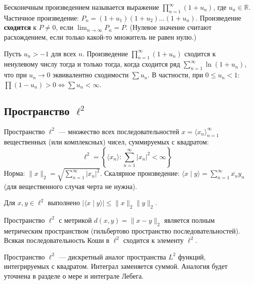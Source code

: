 \documentclass[11pt, a4paper]{extarticle}
\newcommand{\R}{{\mathbb R}}
\renewcommand{\le}{\leqslant}
\begin{document}
\begin{definition}
Бесконечным произведением называется выражение $\prod_{n=1}^\infty (1 + u_n)$, где $u_n \in \R$. Частичное произведение: $P_n = (1+u_1)(1+u_2)\ldots(1+u_n)$. Произведение \textbf{сходится} к $P \neq 0$, если $\lim_{n\to\infty} P_n = P$. (Нулевое значение считают расхождением, если только какой-то множитель не равен нулю.)
\end{definition}

\begin{theorem}
Пусть $u_n > -1$ для всех $n$. Произведение $\prod_{n=1}^\infty (1+u_n)$ сходится к ненулевому числу тогда и только тогда, когда сходится ряд $\sum_{n=1}^\infty \ln(1+u_n)$, что при $u_n \to 0$ эквивалентно сходимости $\sum u_n$. В частности, при $0 \le u_n < 1$: $\prod(1-u_n) > 0 \iff \sum u_n < \infty$.
\end{theorem}

\subsection{Пространство \texorpdfstring{$\ell^2$}{l2}}

\begin{definition}
Пространство $\ell^2$ --- множество всех последовательностей $x = \langle x_n \rangle_{n=1}^\infty$ вещественных (или комплексных) чисел, суммируемых с квадратом:
$$\ell^2 = \left\{ \langle x_n \rangle : \sum_{n=1}^\infty |x_n|^2 < \infty \right\}$$
Норма: $\|x\|_2 = \sqrt{\sum_{n=1}^\infty |x_n|^2}$. Скалярное произведение: $\langle x \mid y \rangle = \sum_{n=1}^\infty \overline{x_n} y_n$ (для вещественного случая черта не нужна).
\end{definition}

\begin{theorem}
Для $x, y \in \ell^2$ выполнено $|\langle x \mid y \rangle| \le \|x\|_2 \|y\|_2$.
\end{theorem}

\begin{theorem}
Пространство $\ell^2$ с метрикой $d(x,y) = \|x-y\|_2$ является полным метрическим пространством (гильбертово пространство последовательностей). Всякая последовательность Коши в $\ell^2$ сходится к элементу $\ell^2$.
\end{theorem}

\begin{remark}
Пространство $\ell^2$ --- дискретный аналог пространства $L^2$ функций, интегрируемых с квадратом. Интеграл заменяется суммой. Аналогия будет уточнена в разделе о мере и интеграле Лебега.
\end{remark}
\end{document}
